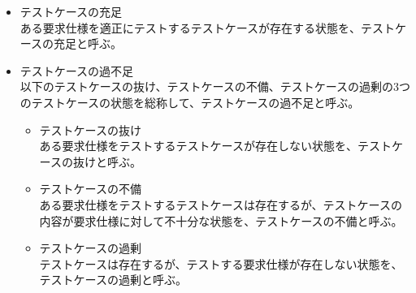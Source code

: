 \begin{itemize}
    \item テストケースの充足\\
    ある要求仕様を適正にテストするテストケースが存在する状態を、テストケースの充足と呼ぶ。
    \item テストケースの過不足\\
    以下のテストケースの抜け、テストケースの不備、テストケースの過剰の3つのテストケースの状態を総称して、テストケースの過不足と呼ぶ。
    \begin{itemize}
        \item テストケースの抜け\\
        ある要求仕様をテストするテストケースが存在しない状態を、テストケースの抜けと呼ぶ。
        \item テストケースの不備\\
        ある要求仕様をテストするテストケースは存在するが、テストケースの内容が要求仕様に対して不十分な状態を、テストケースの不備と呼ぶ。
        \item テストケースの過剰\\
        テストケースは存在するが、テストする要求仕様が存在しない状態を、テストケースの過剰と呼ぶ。
    \end{itemize}
\end{itemize}
